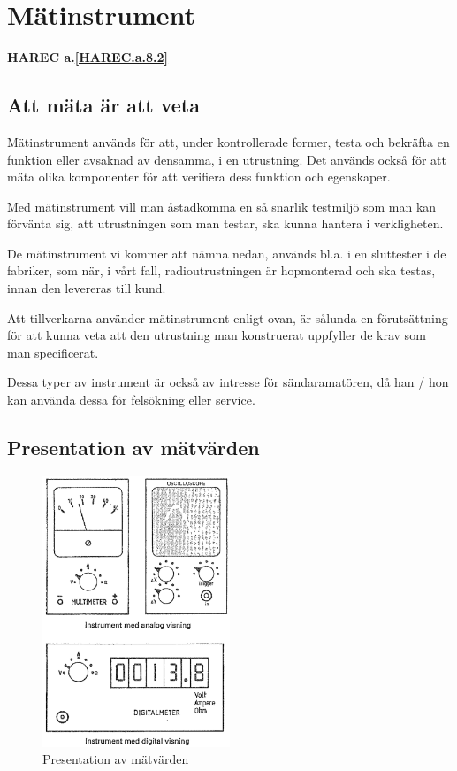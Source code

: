 \section{Mätinstrument}
\textbf{
  HAREC a.\ref{HAREC.a.8.2}\label{myHAREC.a.8.2}
}

\subsection{Att mäta är att veta}

Mätinstrument används för att, under kontrollerade former, testa och bekräfta
en funktion eller avsaknad av densamma, i en utrustning.
Det används också för att mäta olika komponenter för att verifiera dess
funktion och egenskaper.

Med mätinstrument vill man åstadkomma en så snarlik testmiljö som man kan
förvänta sig, att utrustningen som man testar, ska kunna hantera i
verkligheten.

De mätinstrument vi kommer att nämna nedan, används bl.a. i en sluttester i de
fabriker, som när, i vårt fall, radioutrustningen är hopmonterad och ska
testas, innan den levereras till kund.

Att tillverkarna använder mätinstrument enligt ovan, är sålunda en
förutsättning för att kunna veta att den utrustning man konstruerat uppfyller
de krav som man specificerat.

Dessa typer av instrument är också av intresse för sändaramatören, då han / hon
kan använda dessa för felsökning eller service.

\subsection{Presentation av mätvärden}

\begin{figure}
  \includegraphics[width=0.5\textwidth]{images/cropped_pdfs/bild_2_8-02.pdf}
  \caption{Presentation av mätvärden}
  \label{fig:bildII8-2}
\end{figure}

